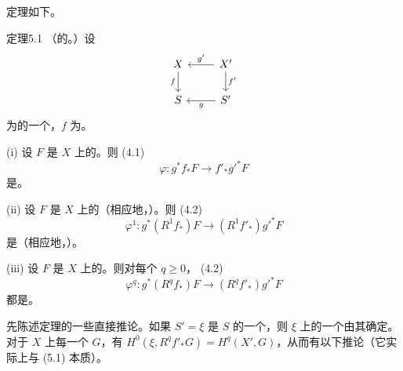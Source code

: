 定理如下。
\begin{SGAresult}{定理}{5.1}
（的。）设
\[
\begin{tikzcd}
X\arrow[d,"f"']&X'\arrow[l,"g'"']\arrow[d,"f'"]\\
S&S'\arrow[l,"g"]
\end{tikzcd}
\]
为的一个，$f$ 为。

(i) 设 $F$ 是 $X$ 上的。则 (4.1)
\[
\varphi:g^*f_*F\longrightarrow f'_*g'^*F
\]
是。

(ii) 设 $F$ 是 $X$ 上的（相应地，）。则 (4.2)
\[
\varphi^1:g^*(R^1f_*)F\longrightarrow(R^1f'_*)g'^*F
\]
是（相应地，）。

(iii) 设 $F$ 是 $X$ 上的。则对每个 $q\geq0$， (4.2)
\[
\varphi^q:g^*(R^qf_*)F\longrightarrow(R^qf'_*)g'^*F
\]
都是。
\end{SGAresult}
先陈述定理的一些直接推论。如果 $S'=\xi$ 是 $S$ 的一个，则 $\xi$ 上的一个由其确定。对于 $X$ 上每一个 $G$，有 $H^0(\xi,R^qf'_*G)=H^q(X',G)$，从而有以下推论（它实际上与 (5.1) 本质）。

